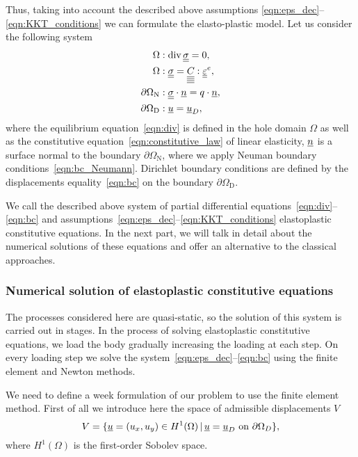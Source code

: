 \documentclass[12pt]{article}
\newcommand{\todounderline}[1]{\todo[inline, size=\scriptsize]{#1}}
\begin{document}
Thus, taking into account the described above assumptions \ref{eqn:eps_dec}--\ref{eqn:KKT_conditions} we can formulate the elasto-plastic model. Let us consider the following system
\begin{align}
    \Omega &: \operatorname{div} \underline{\underline{\sigma}} = 0 , \label{eqn:div}\\
    \Omega &: \underline{\underline{\sigma}} = \underline{\underline{\underline{\underline{C_{}}}}} : \underline{\underline{\varepsilon}}^e, \label{eqn:constitutive_law}\\
    \partial\Omega_\text{N} &: \underline{\underline{\sigma}} \cdot \underline{n} = q \cdot \underline{n}, \label{eqn:bc_Neumann} \\
    \partial\Omega_\text{D} &: \underline{u} = \underline{u}_D, \label{eqn:bc}
\end{align}
where the equilibrium equation~\ref{eqn:div} is defined in the hole domain $\Omega$ as well as the constitutive equation~\ref{eqn:constitutive_law} of linear elasticity, $\underline{n}$ is a surface normal to the boundary $\partial\Omega_\text{N}$, where we apply Neuman boundary conditions~\ref{eqn:bc_Neumann}. Dirichlet boundary conditions are defined by the displacements equality~\ref{eqn:bc} on the boundary $\partial\Omega_\text{D}$.

We call the described above system of partial differential equations~\ref{eqn:div}--\ref{eqn:bc} and assumptions~\ref{eqn:eps_dec}--\ref{eqn:KKT_conditions} elastoplastic constitutive equations. In the next part, we will talk in detail about the numerical solutions of these equations and offer an alternative to the classical approaches.

\subsubsection{Numerical solution of elastoplastic constitutive equations}

The processes considered here are quasi-static, so the solution of this system is carried out in stages. In the process of solving elastoplastic constitutive equations, we load the body gradually increasing the loading at each step.
\todounderline{Finish this}
On every loading step we solve the system~\ref{eqn:eps_dec}--\ref{eqn:bc} using the finite element and Newton methods.

We need to define a week formulation of our problem to use the finite element method. First of all we introduce here the space of admissible displacements $V$
\begin{equation}
    V = \{\underline{u} = (u_x, u_y) \in H^1(\Omega) \, | \, \underline{u} = \underline{u}_D \text{ on } \partial\Omega_D \},
\end{equation}
where $H^1(\Omega)$ is the first-order Sobolev space.
\end{document}
